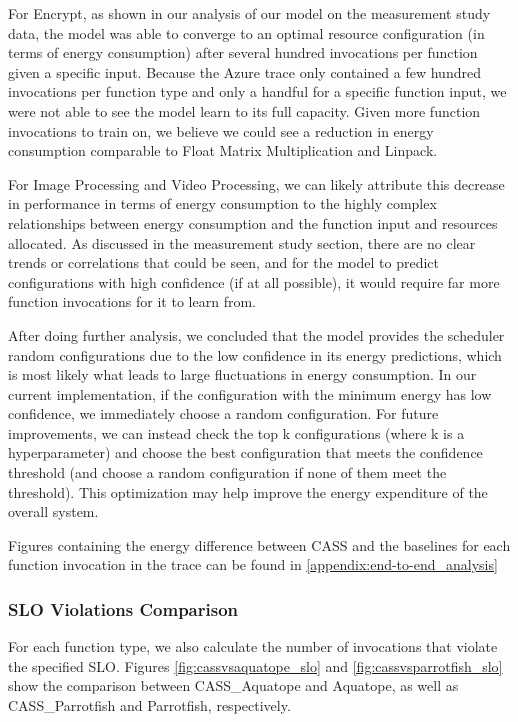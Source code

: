 \documentclass[times, 10pt,twocolumn]{article}
\begin{document}
For Encrypt, as shown in our analysis of our model on the measurement study data, the model was able to converge to an optimal resource configuration (in terms of energy consumption) after several hundred invocations per function given a specific input. Because the Azure trace only contained a few hundred invocations per function type and only a handful for a specific function input, we were not able to see the model learn to its full capacity. Given more function invocations to train on, we believe we could see a reduction in energy consumption comparable to Float Matrix Multiplication and Linpack.

For Image Processing and Video Processing, we can likely attribute this decrease in performance in terms of energy consumption to the highly complex relationships between energy consumption and the function input and resources allocated. As discussed in the measurement study section, there are no clear trends or correlations that could be seen, and for the model to predict configurations with high confidence (if at all possible), it would require far more function invocations for it to learn from. 

After doing further analysis, we concluded that the model provides the scheduler random configurations due to the low confidence in its energy predictions, which is most likely what leads to large fluctuations in energy consumption. In our current implementation, if the configuration with the minimum energy has low confidence, we immediately choose a random configuration. For future improvements, we can instead check the top k configurations (where k is a hyperparameter) and choose the best configuration that meets the confidence threshold (and choose a random configuration if none of them meet the threshold). This optimization may help improve the energy expenditure of the overall system. 

Figures containing the energy difference between CASS and the baselines for each function invocation in the trace can be found in \ref{appendix:end-to-end_analysis}

\subsubsection{SLO Violations Comparison}

For each function type, we also calculate the number of invocations that violate the specified SLO. Figures \ref{fig:cassvsaquatope_slo} and \ref{fig:cassvsparrotfish_slo} show the comparison between CASS\_Aquatope and Aquatope, as well as CASS\_Parrotfish and Parrotfish, respectively. 
\end{document}
